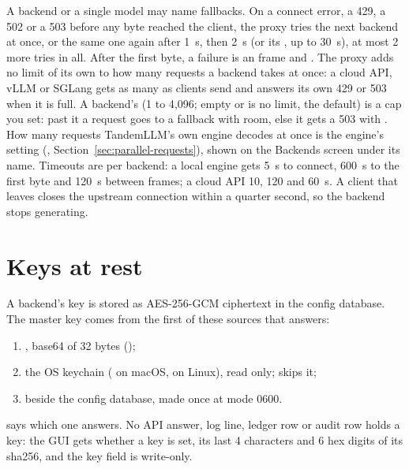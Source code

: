 A backend or a single model may name fallbacks. On a connect error, a 429, a 502 or a 503 before any byte reached the client, the proxy tries the next backend at once, or the same one again after 1~s, then 2~s (or its , up to 30~s), at most 2 more tries in all. After the first byte, a failure is an  frame and \code{[DONE]}. The proxy adds no limit of its own to how many requests a backend takes at once: a cloud API, vLLM or SGLang gets as many as clients send and answers its own 429 or 503 when it is full. A backend's  (1 to 4{,}096; empty or  is no limit, the default) is a cap you set: past it a request goes to a fallback with room, else it gets a 503 with . How many requests TandemLLM's own engine decodes at once is the engine's setting (, Section~\ref{sec:parallel-requests}), shown on the Backends screen under its name. Timeouts are per backend: a local engine gets 5~s to connect, 600~s to the first byte and 120~s between frames; a cloud API 10, 120 and 60~s. A client that leaves closes the upstream connection within a quarter second, so the backend stops generating.

\section{Keys at rest}

A backend's key is stored as AES-256-GCM ciphertext in the config database. The master key comes from the first of these sources that answers:

\begin{enumerate}
\item {}, base64 of 32 bytes ();
\item the OS keychain ( on macOS,  on Linux), read only;  skips it;
\item {} beside the config database, made once at mode 0600.
\end{enumerate}

 says which one answers. No API answer, log line, ledger row or audit row holds a key: the GUI gets whether a key is set, its last 4 characters and 6 hex digits of its sha256, and the key field is write-only.

